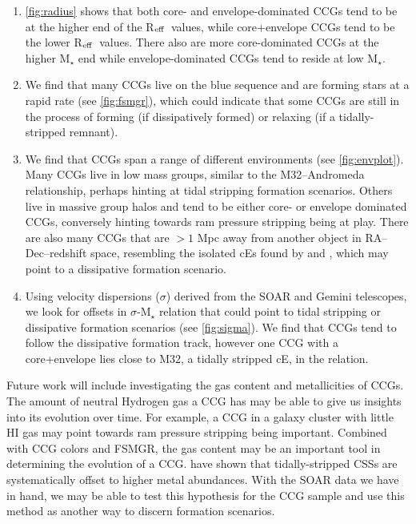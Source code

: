 \documentclass[iop,apj]{emulateapj}
\newcommand{\Reff}{R$_{\rm eff}$}
\begin{document}
\begin{enumerate}
\item \autoref{fig:radius} shows that both core- and envelope-dominated CCGs tend to be at the higher end of the \Reff\ values, while core+envelope CCGs tend to be the lower \Reff\ values. There also are more core-dominated CCGs at the higher M$_{\star}$ end while envelope-dominated CCGs tend to reside at low M$_{\star}$.

\item We find that many CCGs live on the blue sequence and are forming stars at a rapid rate (see \autoref{fig:fsmgr}), which could indicate that some CCGs are still in the process of forming (if dissipatively formed) or relaxing (if a tidally-stripped remnant).

\item We find that CCGs span a range of different environments (see \autoref{fig:envplot}). Many CCGs live in low mass groups, similar to the M32--Andromeda relationship, perhaps hinting at tidal stripping formation scenarios. Others live in massive group halos and tend to be either core- or envelope dominated CCGs, conversely hinting towards ram pressure stripping being at play. There are also many CCGs that are $>1$ Mpc away from another object in RA--Dec--redshift space, resembling the isolated cEs found by \citet{Huxor2013} and \citet{Paudel2014}, which may point to a dissipative formation scenario.

\item Using velocity dispersions ($\sigma$) derived from the SOAR and Gemini telescopes, we look for offsets in $\sigma$-M$_{\star}$ relation that could point to tidal stripping or dissipative formation scenarios (see \autoref{fig:sigma}). We find that CCGs tend to follow the dissipative formation track, however one CCG with a core+envelope lies close to M32, a tidally stripped cE, in the relation. 
\end{enumerate}

\noindent Future work will include investigating the gas content and metallicities of CCGs. The amount of neutral Hydrogen gas a CCG has may be able to give us insights into its evolution over time. For example, a CCG in a galaxy cluster with little HI gas may point towards ram pressure stripping being important. Combined with CCG colors and FSMGR, the gas content may be an important tool in determining the evolution of a CCG. \citet{Janz2015} have shown that tidally-stripped CSSs are systematically offset to higher metal abundances. With the SOAR data we have in hand, we may be able to test this hypothesis for the CCG sample and use this method as another way to discern formation scenarios.





\appendix
\label{app}
\end{document}
